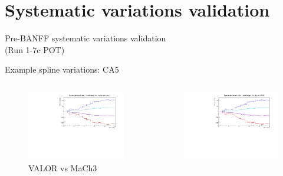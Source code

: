 \documentclass{beamer}
\begin{document}
\section{Systematic variations validation}
\begin{frame}
	\centering
	\Large Pre-BANFF systematic variations validation\\(Run 1-7c POT)
\end{frame}

\begin{frame}{Example spline variations: CA5}
	\centering
	\begin{columns}
		\begin{column}{0.5\paperwidth}
			\begin{figure}
				\includegraphics[page=11, trim={0cm 0cm 0cm 0cm}, clip, scale=0.35] {images/variations/valor_mach3/variations_prebanff_unosc_1Re}
				\caption{VALOR vs MaCh3}
			\end{figure}
		\end{column}
		\begin{column}{0.5\paperwidth}
			\begin{figure}
				\includegraphics[page=7, trim={0cm 0cm 0cm 0cm}, clip, scale=0.35] {images/variations/valor_ptheta/variations_prebanff_unosc_1Re}

\end{figure}
\end{column}
\end{columns}
\end{frame}
\end{document}
